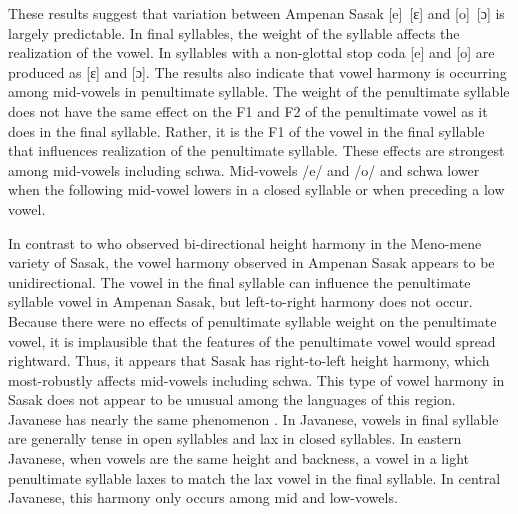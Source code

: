 \documentclass[12pt]{ouparticle}
\begin{document}
These results suggest that variation between Ampenan Sasak [e]~[ɛ] and [o]~[ɔ] is largely predictable. In final syllables, the weight of the syllable affects the realization of the vowel. In syllables with a non-glottal stop coda [e] and [o] are produced as [ɛ] and [ɔ]. The results also indicate that vowel harmony is occurring among mid-vowels in penultimate syllable. The weight of the penultimate syllable does not have the same effect on the F1 and F2 of the penultimate vowel as it does in the final syllable. Rather, it is the F1 of the vowel in the final syllable that influences realization of the penultimate syllable. These effects are strongest among mid-vowels including schwa. Mid-vowels /e/ and /o/ and schwa lower when the following mid-vowel lowers in a closed syllable or when preceding a low vowel. 

In contrast to \citet{chahal1998} who observed bi-directional height harmony in the Meno-mene variety of Sasak, the vowel harmony observed in Ampenan Sasak appears to be unidirectional. The vowel in the final syllable can influence the penultimate syllable vowel in Ampenan Sasak, but left-to-right harmony does not occur. Because there were no effects of penultimate syllable weight on the penultimate vowel, it is implausible that the features of the penultimate vowel would spread rightward.  Thus, it appears that Sasak has right-to-left height harmony, which most-robustly affects mid-vowels including schwa. This type of vowel harmony in Sasak does not appear to be unusual among the languages of this region. Javanese has nearly the same phenomenon \citep{adisasmito1999}. In Javanese, vowels in final syllable are generally tense in open syllables and lax in closed syllables. In eastern Javanese, when vowels are the same height and backness, a vowel in a light penultimate syllable laxes to match the lax vowel in the final syllable. In central Javanese, this harmony only occurs among mid and low-vowels.
\end{document}
